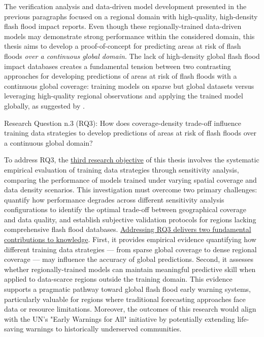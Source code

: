 The  verification analysis and data-driven model development presented in the previous paragraphs focused on a regional domain with high-quality, high-density flash flood impact reports. Even though these regionally-trained data-driven models may demonstrate strong performance within the considered domain, this thesis aims to develop a proof-of-concept for predicting areas at risk of flash floods \textit{over a continuous global domain}. The lack of high-density global flash flood impact databases \citep{Panwar_2020} creates a fundamental tension between two contrasting approaches for developing predictions of areas at risk of flash floods with a continuous global coverage: training models on sparse but global datasets versus leveraging high-quality regional observations and applying the trained model globally, as suggested by \citet{Kratzert_2024}. 

\begin{tcolorbox}[
  colframe=colour_chapter7,  
  colback=white,           
  sharp corners,        
  boxrule=2mm,          
  left=0mm,             
  right=0mm,            
  toprule=0mm,          
  bottomrule=0mm,       
  rightrule=2mm        
]
{\color{colour_chapter7} {\setlength{\parindent}{1.0em} Research Question n.3 (RQ3): How does coverage-density trade-off influence training data strategies to develop predictions of areas at risk of flash floods over a continuous global domain?}}
\end{tcolorbox}

\noindent To address RQ3, the \uline{third research objective} of this thesis involves the systematic empirical evaluation of training data strategies through sensitivity analysis, comparing the performance of models trained under varying spatial coverage and data density scenarios. This investigation must overcome two primary challenges: quantify how performance degrades across different sensitivity analysis configurations to identify the optimal trade-off between geographical coverage and data quality, and establish subjective validation protocols for regions lacking comprehensive flash flood databases. \uline{Addressing RQ3 delivers two fundamental contributions to knowledge}. First, it provides empirical evidence quantifying how different training data strategies — from sparse global coverage to dense regional coverage — may influence the accuracy of global predictions. Second, it assesses whether regionally-trained models can maintain meaningful predictive skill when applied to data-scarce regions outside the training domain. This evidence supports a pragmatic pathway toward global flash flood early warning systems, particularly valuable for regions where traditional forecasting approaches face data or resource limitations. Moreover, the outcomes of this research would align with the UN's "Early Warnings for All" initiative by potentially extending life-saving warnings to historically underserved communities.

